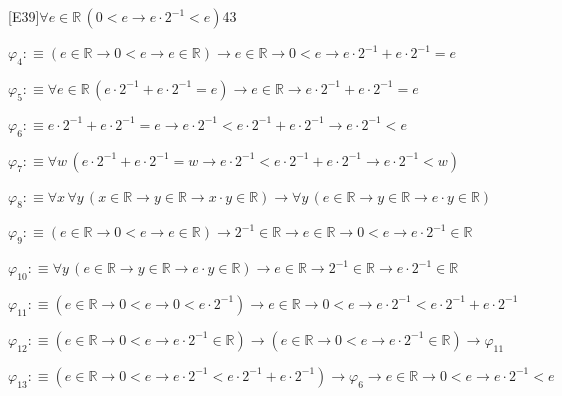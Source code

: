 \begin{fullproof}{[E39]}{$\forall e \in \mathbb{R}\,(0 < e \to e \cdot 2^{-1} < e)$}{43}
\begin{abbrevlist}
\item $\varphi_{4} :\equiv (e \in \mathbb{R} \to 0 < e \to e \in \mathbb{R}) \to e \in \mathbb{R} \to 0 < e \to e \cdot 2^{-1} + e \cdot 2^{-1} = e$
\item $\varphi_{5} :\equiv \forall e \in \mathbb{R}\,(e \cdot 2^{-1} + e \cdot 2^{-1} = e) \to e \in \mathbb{R} \to e \cdot 2^{-1} + e \cdot 2^{-1} = e$
\item $\varphi_{6} :\equiv e \cdot 2^{-1} + e \cdot 2^{-1} = e \to e \cdot 2^{-1} < e \cdot 2^{-1} + e \cdot 2^{-1} \to e \cdot 2^{-1} < e$
\item $\varphi_{7} :\equiv \forall w\,(e \cdot 2^{-1} + e \cdot 2^{-1} = w \to e \cdot 2^{-1} < e \cdot 2^{-1} + e \cdot 2^{-1} \to e \cdot 2^{-1} < w)$
\item $\varphi_{8} :\equiv \forall x\,\forall y\,(x \in \mathbb{R} \to y \in \mathbb{R} \to x \cdot y \in \mathbb{R}) \to \forall y\,(e \in \mathbb{R} \to y \in \mathbb{R} \to e \cdot y \in \mathbb{R})$
\item $\varphi_{9} :\equiv (e \in \mathbb{R} \to 0 < e \to e \in \mathbb{R}) \to 2^{-1} \in \mathbb{R} \to e \in \mathbb{R} \to 0 < e \to e \cdot 2^{-1} \in \mathbb{R}$
\item $\varphi_{10} :\equiv \forall y\,(e \in \mathbb{R} \to y \in \mathbb{R} \to e \cdot y \in \mathbb{R}) \to e \in \mathbb{R} \to 2^{-1} \in \mathbb{R} \to e \cdot 2^{-1} \in \mathbb{R}$
\item $\varphi_{11} :\equiv (e \in \mathbb{R} \to 0 < e \to 0 < e \cdot 2^{-1}) \to e \in \mathbb{R} \to 0 < e \to e \cdot 2^{-1} < e \cdot 2^{-1} + e \cdot 2^{-1}$
\item $\varphi_{12} :\equiv (e \in \mathbb{R} \to 0 < e \to e \cdot 2^{-1} \in \mathbb{R}) \to (e \in \mathbb{R} \to 0 < e \to e \cdot 2^{-1} \in \mathbb{R}) \to \varphi_{11}$
\item $\varphi_{13} :\equiv (e \in \mathbb{R} \to 0 < e \to e \cdot 2^{-1} < e \cdot 2^{-1} + e \cdot 2^{-1}) \to \varphi_{6} \to e \in \mathbb{R} \to 0 < e \to e \cdot 2^{-1} < e$
\end{abbrevlist}
\end{fullproof}
